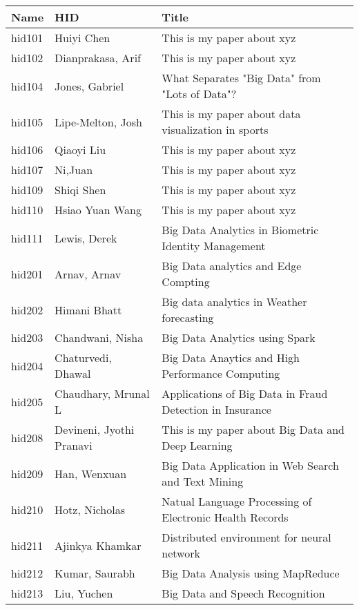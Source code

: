 \documentclass[12pt]{article}
\begin{document}
\begin{footnotesize}
\begin{longtable}{|p{1cm}p{5cm}p{9cm}|}
\hline \textbf{Name} & \textbf{HID} & \textbf{Title} \\ \hline \hline

hid101 & Huiyi Chen & This is my paper about xyz  \\
\hline
hid102 & Dianprakasa, Arif & This is my paper about xyz  \\
\hline
hid104 & Jones, Gabriel & What Separates "Big Data" from "Lots of Data"?  \\
\hline
hid105 & Lipe-Melton, Josh & This is my paper about data visualization in sports  \\
\hline
hid106 & Qiaoyi Liu & This is my paper about xyz  \\
\hline
hid107 & Ni,Juan & This is my paper about xyz  \\
\hline
hid109 & Shiqi Shen & This is my paper about xyz  \\
\hline
hid110 & Hsiao Yuan Wang & This is my paper about xyz  \\
\hline
hid111 & Lewis, Derek & Big Data Analytics in Biometric Identity Management  \\
\hline
hid201 & Arnav, Arnav & Big Data analytics and Edge Compting  \\
\hline
hid202 & Himani Bhatt & Big data analytics in Weather forecasting  \\
\hline
hid203 & Chandwani, Nisha & Big Data Analytics using Spark  \\
\hline
hid204 & Chaturvedi, Dhawal & Big Data Anaytics and High Performance Computing  \\
\hline
hid205 & Chaudhary, Mrunal L & Applications of Big Data in Fraud Detection in Insurance  \\
\hline
hid208 & Devineni, Jyothi Pranavi & This is my paper about Big Data and Deep Learning  \\
\hline
hid209 & Han, Wenxuan & Big Data Application in Web Search and Text Mining  \\
\hline
hid210 & Hotz, Nicholas & Natual Language Processing of Electronic Health Records  \\
\hline
hid211 & Ajinkya Khamkar & Distributed environment for neural network  \\
\hline
hid212 & Kumar, Saurabh & Big Data Analysis using MapReduce  \\
\hline
hid213 & Liu, Yuchen & Big Data and Speech Recognition  \\

\end{longtable}
\end{footnotesize}
\end{document}
